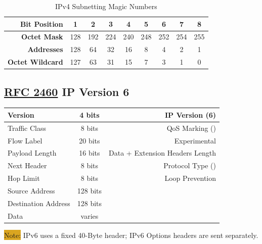 \documentclass[12pt]{article}
\newcommand{\note}[1]{\colorbox{#1}{Note:}}
\newcommand{\RFC}[1]{\href{https://datatracker.ietf.org/doc/html/rfc#1}{RFC #1}}
\begin{document}
	\begin{table}[H]
	\centering
	\caption{IPv4 Subnetting Magic Numbers \label{tab:SUBNETTING}}
	\begin{tabular}{r | cccccccc}
	\hline
	\textbf{Bit Position}	& 1	& 2	& 3	& 4	& 5	& 6	& 7 & 8\\\hline
	\textbf{Octet Mask}	& 128 & 192 & 224 & 240 & 248 & 252 & 254 & 255\\\hline
	\textbf{Addresses}	& 128	& 64	& 32	& 16	& 8	& 4	& 2	& 1\\\hline
	\textbf{Octet Wildcard}	& 127	& 63	& 31 	& 15	& 7	& 3	& 1	& 0\\\hline
	\end{tabular}\end{table}


	\subsection[RFC 2460 IPv6]{\RFC{2460} IP Version 6 \label{subsec:IPV6}}
	\begin{table}[H]
	\centering
	\begin{tabular}{| l | c | r |}
	\hline
	Version			& 4 bits	& IP Version (6)\\\hline
	Traffic Class			& 8 bits	& QoS Marking (\Cref{sec:QOS})\\\hline
	Flow Label			& 20 bits	& Experimental\\\hline
	Payload Length		& 16 bits	& Data + Extension Headers Length\\\hline
	Next Header		& 8 bits	& Protocol Type (\Cref{tab:L3 PROTOCOL})\\\hline
	Hop Limit			& 8 bits	& Loop Prevention\\\hline
	Source Address		& 128 bits	&\\\hline
	Destination Address	& 128 bits	&\\\hline
	Data				& varies	&\\\hline
	\end{tabular}\end{table}
	\note{Goldenrod} IPv6 uses a fixed 40-Byte header; IPv6 Options headers are sent separately.
\end{document}
